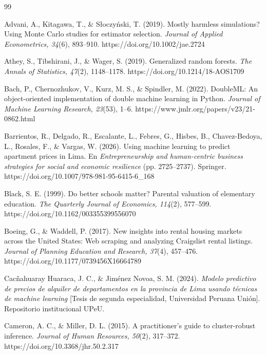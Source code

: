 \begin{thebibliography}{99}
\setlength{\itemsep}{0.3em}

Advani, A., Kitagawa, T., \& Słoczyński, T. (2019). Mostly harmless simulations? Using Monte Carlo studies for estimator selection. \textit{Journal of Applied Econometrics, 34}(6), 893--910. https://doi.org/10.1002/jae.2724

Athey, S., Tibshirani, J., \& Wager, S. (2019). Generalized random forests. \textit{The Annals of Statistics, 47}(2), 1148--1178. https://doi.org/10.1214/18-AOS1709

Bach, P., Chernozhukov, V., Kurz, M. S., \& Spindler, M. (2022). DoubleML: An object-oriented implementation of double machine learning in Python. \textit{Journal of Machine Learning Research, 23}(53), 1--6. https://www.jmlr.org/papers/v23/21-0862.html

Barrientos, R., Delgado, R., Escalante, L., Febres, G., Hisbes, B., Chavez-Bedoya, L., Rosales, F., \& Vargas, W. (2026). Using machine learning to predict apartment prices in Lima. En \textit{Entrepreneurship and human-centric business strategies for social and economic resilience} (pp. 2725--2737). Springer. https://doi.org/10.1007/978-981-95-6415-6\_168

Black, S. E. (1999). Do better schools matter? Parental valuation of elementary education. \textit{The Quarterly Journal of Economics, 114}(2), 577--599. https://doi.org/10.1162/003355399556070

Boeing, G., \& Waddell, P. (2017). New insights into rental housing markets across the United States: Web scraping and analyzing Craigslist rental listings. \textit{Journal of Planning Education and Research, 37}(4), 457--476. https://doi.org/10.1177/0739456X16664789

Cacñahuaray Huaraca, J. C., \& Jiménez Novoa, S. M. (2024). \textit{Modelo predictivo de precios de alquiler de departamentos en la provincia de Lima usando técnicas de machine learning} [Tesis de segunda especialidad, Universidad Peruana Unión]. Repositorio institucional UPeU.

Cameron, A. C., \& Miller, D. L. (2015). A practitioner's guide to cluster-robust inference. \textit{Journal of Human Resources, 50}(2), 317--372. https://doi.org/10.3368/jhr.50.2.317


\end{thebibliography}
